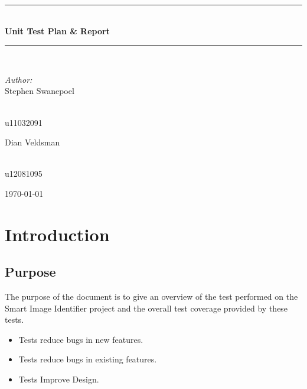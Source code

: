 \documentclass[a4paper,12pt]{report}
\newcommand{\HRule}{\rule{\linewidth}{0.5mm}}
\begin{document}
\begin{titlepage}
\begin{center}
\HRule \\[0.4cm]
{ \huge \bfseries Unit Test Plan \& Report}\\[0.4cm]
\HRule \\[0.4cm]
\begin{minipage}{0.4\textwidth}
\begin{flushleft} \large
\emph{Author:}\\
Stephen {Swanepoel}
\end{flushleft}
\end{minipage}
\begin{minipage}{0.4\textwidth}
\begin{flushright} \large
\emph{} \\
u11032091
\end{flushright}
\end{minipage}
\begin{minipage}{0.4\textwidth}
\begin{flushleft} \large
Dian {Veldsman}
\end{flushleft}
\end{minipage}
\begin{minipage}{0.4\textwidth}
\begin{flushright} \large
\emph{} \\
u12081095
\end{flushright}
\end{minipage}


{\large \today}
\end{center}
\end{titlepage}
\footnotesize
\normalsize

\tableofcontents

\renewcommand{\thesection}{\arabic{section}}
\newpage

\section {Introduction}
	\subsection {Purpose}
		The purpose of the document is to give an overview of the test performed on the Smart Image Identifier project and the overall test coverage provided by these tests.\linebreak
		\begin{itemize}
			\item Tests reduce bugs in new features.
			\item Tests reduce bugs in existing features.
			\item Tests Improve Design.
		\end{itemize}
\end{document}
